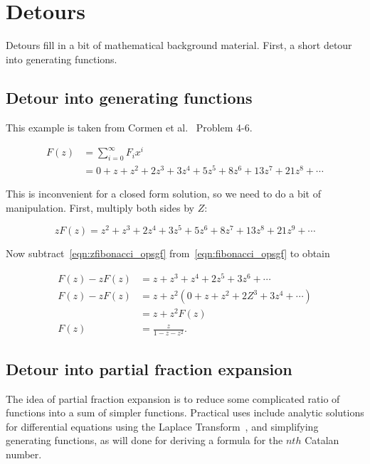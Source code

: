 \documentclass{article}
\begin{document}
\section{Detours}

Detours fill in a bit of mathematical background material.
First, a short detour into generating functions.

\subsection{Detour into generating functions}

This example is taken from Cormen et al.~\cite[p. 74]{cormen:th:1990}
Problem 4-6.

\begin{align}
F(z) & = \sum_{i=0}^{\infty} F_ix^i\\
\label{eqn:fibonacci_opsgf}
     & = 0 + z + z^2 + 2z^3 + 3z^4 + 5z^5 + 8z^6 + 13z^7 + 21z^8+\cdots
\end{align}

This is inconvenient for a closed form solution, so we need to do a bit of
manipulation. First, multiply both sides by $Z$:

\begin{equation}
\label{eqn:zfibonacci_opsgf}
zF(z) = z^2 + z^3 + 2z^4 + 3z^5 + 5z^6 + 8z^7 + 13z^8 + 21z^9+\cdots
\end{equation}

Now subtract~\ref{eqn:zfibonacci_opsgf} from~\ref{eqn:fibonacci_opsgf} to
obtain

\begin{align}
F(z) - zF(z) & = z + z^3 + z^4 + 2z^5 + 3z^6 +\cdots\\
F(z) - zF(z) & = z + z^2(0 + z + z^2 + 2Z^3 + 3z^4 +\cdots)\\
             & = z + z^2F(z)\\
        F(z) & = \frac{z}{1-z-z^2}.
\end{align}


\subsection{Detour into partial fraction expansion}

The idea of partial fraction expansion is to reduce some
complicated ratio of functions into a sum of simpler functions.
Practical uses include analytic solutions for differential equations
using the Laplace Transform~\cite[p. 347]{nagle:rk1989}, and simplifying
generating functions, as will done for deriving a formula for the
$nth$ Catalan number.
\end{document}
